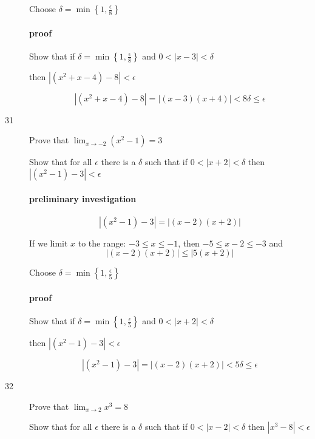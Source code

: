 \documentclass[letterpaper, landscape]{exam}
\begin{document}
\begin{description}
        Choose $\delta = \min \left\{1, \frac{\epsilon}{8} \right\}$

        \paragraph{proof}
        Show that if $\delta = \min \left\{ 1, \frac{\epsilon}{8} \right\}$ and 
        $0 < |x - 3| < \delta$ 
        
        then $\left| \left( x^2 + x - 4 \right) - 8 \right| < \epsilon$

        \[
          \left| \left( x^2 + x - 4 \right) - 8 \right| = |(x - 3)(x + 4)| < 8 \delta \leq \epsilon
        \]

      \item[31] Prove that $\lim_{x \to -2} \left( x^2 - 1 \right) = 3$

        Show that for all $\epsilon$ there is a $\delta$ such that if 
        $0 < |x + 2| < \delta$ then $| \left( x^2 - 1 \right) - 3 | < \epsilon$

        \paragraph{preliminary investigation}

        \[
          | \left( x^2 - 1 \right) - 3 | = |(x - 2)(x + 2)| 
        \]

        If we limit $x$ to the range: $-3 \leq x \leq -1$, then $-5 \leq x - 2 \leq -3$ and
        \[
          |(x - 2)(x + 2)| \leq |5 (x + 2)|
        \]

        Choose $\delta = \min \left\{1, \frac{\epsilon}{5} \right\}$

        \paragraph{proof}
        Show that if $\delta = \min \left\{ 1, \frac{\epsilon}{5} \right\}$ and 
        $0 < |x + 2| < \delta$ 
        
        then $| \left( x^2 - 1 \right) - 3 | < \epsilon$

        \[
          | \left( x^2 - 1 \right) - 3 | = |(x - 2)(x + 2)| < 5 \delta \leq \epsilon
        \]

      \item[32] Prove that $\lim_{x \to 2} x^3 = 8$

        Show that for all $\epsilon$ there is a $\delta$ such that if 
        $0 < |x - 2| < \delta$ then $| x^3 - 8 | < \epsilon$


\end{description}
\end{document}
